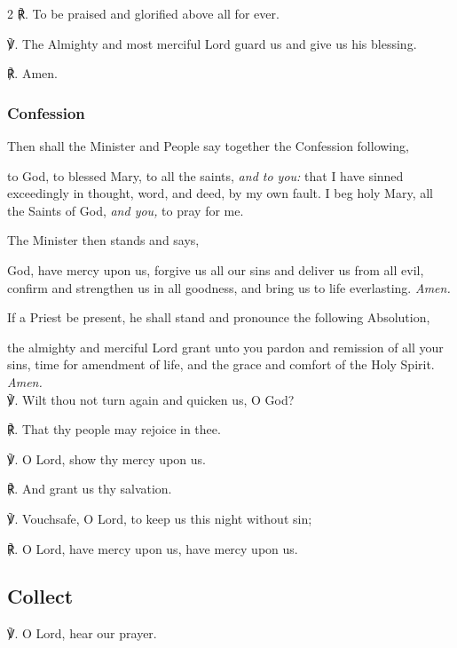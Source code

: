 \begin{multicols}{2}
℟. To be praised and glorified above all for ever.

℣. The Almighty and most merciful Lord guard us and give us his blessing.

℟. Amen.

\subsubsection{Confession}

\begin{rubric}
	Then shall the Minister and People say together the Confession following,
\end{rubric}
 to God, to blessed Mary, to all the saints, \emph{and to you:} that I have sinned exceedingly in thought, word, and deed, by my own fault. I beg holy Mary, all the Saints of God, \emph{and you,} to pray for me.

\begin{rubric}
	The Minister then stands and says,
\end{rubric}
 God, have mercy upon us, forgive us all our sins and deliver us from all evil, confirm and strengthen us in all goodness, and bring us to life everlasting. \textit{Amen.}


\begin{rubric}
	If a Priest be present, he shall stand and pronounce the following Absolution,
\end{rubric}

 the almighty and merciful Lord grant unto you pardon {} and remission of all your sins, time for amendment of life, and the grace and comfort of the Holy Spirit. \textit{Amen.}\\

℣. Wilt thou not turn again and quicken us, O God?

℟. That thy people may rejoice in thee.

℣. O Lord, show thy mercy upon us.

℟. And grant us thy salvation.

℣. Vouchsafe, O Lord, to keep us this night without sin;

℟. O Lord, have mercy upon us, have mercy upon us.

\subsection{Collect}
℣. O Lord, hear our prayer.


\end{multicols}
